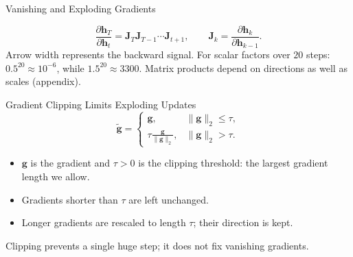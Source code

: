 \documentclass{ntuabeamer}
\begin{document}
\begin{frame}{Vanishing and Exploding Gradients}
  \centering

  \[
    \frac{\partial\mathbf h_T}{\partial\mathbf h_t}=\mathbf J_T\mathbf J_{T-1}\cdots\mathbf J_{t+1},
    \qquad \mathbf J_k=\frac{\partial\mathbf h_k}{\partial\mathbf h_{k-1}}.
  \]
  Arrow width represents the backward signal. For scalar factors over $20$ steps:
  $0.5^{20}\approx10^{-6}$, while $1.5^{20}\approx3300$.
  Matrix products depend on directions as well as scales (appendix).
\end{frame}

\begin{frame}{Gradient Clipping Limits Exploding Updates}
  \[
    \boxed{
      \widetilde{\mathbf{g}}
      =\begin{cases}
        \mathbf{g}, & \|\mathbf{g}\|_2\leq\tau,\\[2mm]
        \displaystyle\tau\frac{\mathbf{g}}{\|\mathbf{g}\|_2},
          & \|\mathbf{g}\|_2>\tau.
      \end{cases}
    }
  \]
  \begin{itemize}
    \item $\mathbf g$ is the gradient and $\tau>0$ is the clipping threshold: the largest gradient length we allow.
    \item Gradients shorter than $\tau$ are left unchanged.
    \item Longer gradients are rescaled to length $\tau$; their direction is kept.
  \end{itemize}
  Clipping prevents a single huge step; it does not fix vanishing gradients.
\end{frame}


\end{document}
